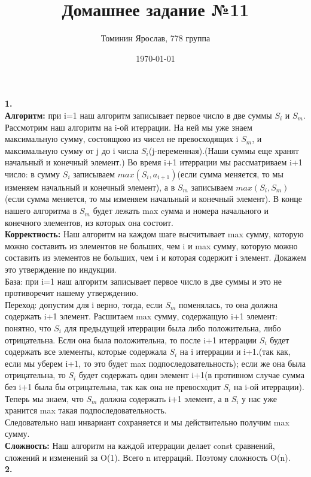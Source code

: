 \documentclass[a4paper,12pt]{article}
\author{Томинин Ярослав, 778 группа}
\title{Домашнее задание №11}
\date{\today}
\begin{document}
 

\maketitle
\newpage
\textbf{1.}\\
\textbf{Алгоритм:} при i=1 наш алгоритм записывает первое число в две суммы $S_i$ и $S_m$. Рассмотрим наш алгоритм на i-ой итеррации. На ней мы уже знаем максимальную сумму, состоящюю из чисел не превосходящих i $S_m$, и максимальную сумму от j до i  числа $S_i$(j-переменная).(Наши суммы еще хранят начальный и конечный элемент.) Во время i+1 итеррации мы рассматриваем i+1 число: в сумму $S_i$ записываем $max(S_i,a_{i+1})$(если сумма меняется,  то мы изменяем начальный и конечный элемент), а в $S_m$ записываем $max(S_i,S_m)$(если сумма меняется,  то мы изменяем начальный и конечный элемент). В конце нашего алгоритма в $S_m$ будет лежать max cумма и номера начального и конечного элементов, из которых она состоит.\\
\textbf{Корректность:} Наш алгоритм на каждом шаге высчитывает max сумму, которую можно составить из элементов не больших, чем i и max сумму, которую можно составить из элементов не больших, чем i и которая содержит i элемент. Докажем это утверждение по индукции.\\
База: при i=1 наш алгоритм записывает первое число в две суммы и это не противоречит нашему утверждению.\\
Переход: допустим для i верно, тогда, если $S_m $ поменялась, то она должна содержать i+1 элемент. Расшитаем max сумму, содержащую i+1 элемент: понятно, что $S_i$ для предыдущей итеррации была либо положительна, либо отрицательна. Если она была положительна, то после i+1 итеррации $S_i$ будет содержать все элементы, которые содержала $S_i$ на i итеррации и i+1.(так как, если мы уберем i+1, то это будет max подпоследовательность); если же она была отрицательна, то $S_i$ будет содержать один элемент i+1(в противном случае сумма без i+1 была бы отрицательна, так как она не превосходит $S_i$ на i-ой итеррации). Теперь мы знаем, что $S_m $ должна содержать i+1 элемент, а в $S_i$ у нас уже хранится max такая подпоследовательность.\\
Следовательно наш инвариант сохраняется и мы действительно получим max сумму.\\
\textbf{Сложность:} Наш алгоритм на каждой итеррации делает const сравнений, сложений и изменений за O(1). Всего n итерраций. Поэтому сложность O(n).\\
\textbf{2.}\\
\end{document}
